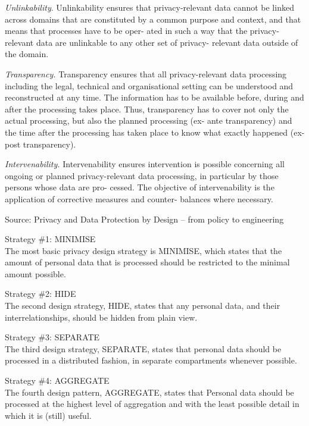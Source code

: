 \documentclass[Screen16to9,17pt]{foils}
\begin{document}
\begin{list2}
\item {\small \emph{Unlinkability}. Unlinkability ensures that privacy-relevant data cannot be linked across domains that are constituted by a common purpose and context, and that means that processes have to be oper-
ated in such a way that the privacy-relevant data are unlinkable to any other set of privacy-
relevant data outside of the domain.}
\item {\small \emph{Transparency.} Transparency ensures that all privacy-relevant data processing including the
legal, technical and organisational setting can be understood and reconstructed at any time.
The information has to be available before, during and after the processing takes place. Thus,
transparency has to cover not only the actual processing, but also the planned processing (ex-
ante transparency) and the time after the processing has taken place to know what exactly
happened (ex-post transparency).}
\item {\small \emph{Intervenability.} Intervenability ensures intervention is possible concerning all ongoing or
planned privacy-relevant data processing, in particular by those persons whose data are pro-
cessed. The objective of intervenability is the application of corrective measures and counter-
balances where necessary.}
\end{list2}
Source: Privacy and Data Protection by Design -- from policy to engineering




\begin{list2}
\item Strategy \#1: MINIMISE\\
The most basic privacy design strategy is MINIMISE, which states that the amount of personal data
that is processed should be restricted to the minimal amount possible.
\item Strategy \#2: HIDE\\
The second design strategy, HIDE, states that any personal data, and their interrelationships, should
be hidden from plain view.
\item Strategy \#3: SEPARATE\\
The third design strategy, SEPARATE, states that personal data should be processed in a distributed
fashion, in separate compartments whenever possible.
\item Strategy \#4: AGGREGATE\\
The fourth design pattern, AGGREGATE, states that Personal data should be processed at the highest
level of aggregation and with the least possible detail in which it is (still) useful.
\end{list2}
\end{document}
